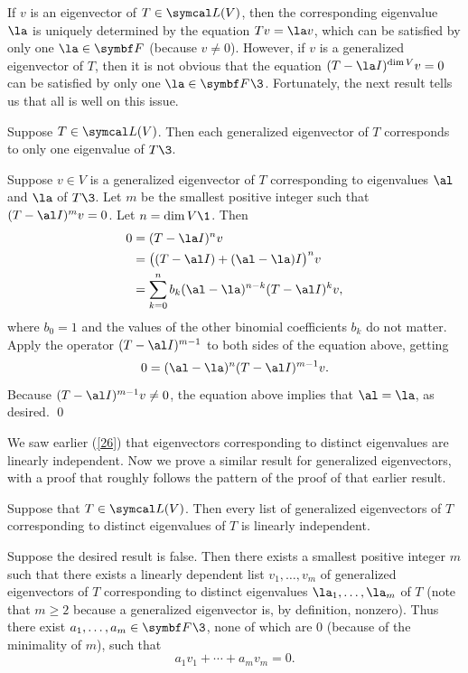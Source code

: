 If $v$ is an eigenvector of $T \in \L(V)$, then the corresponding eigenvalue $\la$ is uniquely determined by the equation $Tv = \la v$, which can be satisfied by only one $\la \in \F{}$ (because $v\ne 0$).
However, if $v$ is a generalized eigenvector of $T$, then it is not obvious that the equation $(T - \la I)^{\dim V}v = 0$ can be satisfied by only one $\la \in \F{}\3$. Fortunately, the next result tells us that all is well on this issue.

{Suppose $T \in \L(V)$. Then each generalized eigenvector of $T$ corresponds to only one eigenvalue of $T\3$.}

\proof
Suppose $v \in V$ is a generalized eigenvector of $T$ corresponding to eigenvalues $\al$ and $\la$ of $T\3$. Let $m$ be the smallest positive integer such that $(T - \al I)^m v = 0$. Let $n = \dim V\1$. Then
\begin{align*}
0 & = (T - \la I)^n v \\
& = \paren[\big]{ (T - \al I) + (\al - \la) I }^n v \\
& = \sum_{k=0}^n b_k (\al - \la)^{n-k} (T - \al I)^k v,
\end{align*}
where $b_0 = 1$ and the values of the other binomial coefficients $b_k$ do not matter. Apply the operator $(T - \al I)^{m-1}$ to both sides of the equation above, getting
\[
0 = (\al - \la)^n (T - \al I)^{m-1} v.
\]
Because $(T - \al I)^{m-1} v \ne 0$, the equation above implies that $\al = \la$, as desired.
\qed

We saw earlier (\ref{26}) that eigenvectors corresponding to distinct eigenvalues are linearly independent. Now we prove a similar result for generalized eigenvectors, with a proof that roughly follows the pattern of the proof of that earlier result.

{Suppose that $T \in \L(V)$. Then every list of generalized eigenvectors of $T$ corresponding to distinct eigenvalues of $T$ is linearly independent.}

\proof
Suppose the desired result is false. Then there exists a smallest positive integer $m$ such that there exists a linearly dependent list
$v_1, \ldots, v_m$ of generalized eigenvectors of $T$ corresponding to distinct eigenvalues $\la_1, \ldots, \la_m$ of $T$ (note that $m\ge 2$ because a generalized eigenvector is, by definition, nonzero). Thus there exist
$a_1, \ldots, a_m \in \F{}\3$, none of which are $0$ (because of the minimality of $m$), such that
\[
a_1 v_1 + \cdots + a_m v_m = 0.
\]

